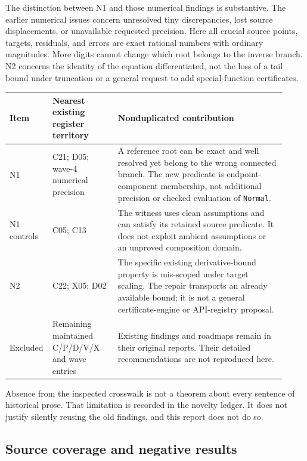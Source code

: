 \documentclass[11pt,letterpaper]{article}
\newcommand{\code}[1]{{\small\nolinkurl{#1}}}
\begin{document}
The distinction between N1 and those numerical findings is substantive. The earlier numerical issues concern unresolved tiny discrepancies, lost source displacements, or unavailable requested precision. Here all crucial source points, targets, residuals, and errors are exact rational numbers with ordinary magnitudes. More digits cannot change which root belongs to the inverse branch. N2 concerns the identity of the equation differentiated, not the loss of a tail bound under truncation or a general request to add special-function certificates.

\begin{longtable}{@{}P{0.10\linewidth}P{0.23\linewidth}P{0.59\linewidth}@{}}
\toprule
Item & Nearest existing register territory & Nonduplicated contribution\\\midrule\endhead
N1 & C21; D05; wave-4 numerical precision & A reference root can be exact and well resolved yet belong to the wrong connected branch. The new predicate is endpoint-component membership, not additional precision or checked evaluation of \code{Normal}.\\[5pt]
N1 controls & C05; C13 & The witness uses clean assumptions and can satisfy its retained source predicate. It does not exploit ambient assumptions or an unproved composition domain.\\[5pt]
N2 & C22; X05; D02 & The specific existing derivative-bound property is mis-scoped under target scaling. The repair transports an already available bound; it is not a general certificate-engine or API-registry proposal.\\[5pt]
Excluded & Remaining maintained C/P/D/V/X and wave entries & Existing findings and roadmaps remain in their original reports. Their detailed recommendations are not reproduced here.\\
\bottomrule
\end{longtable}

Absence from the inspected crosswalk is not a theorem about every sentence of historical prose. That limitation is recorded in the novelty ledger. It does not justify silently reusing the old findings, and this report does not do so.

\subsection{Source coverage and negative results}
\end{document}

